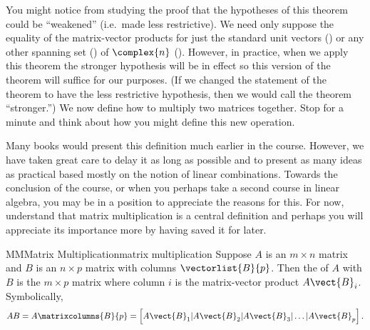 %
You might notice from studying the proof that the hypotheses of this theorem could be ``weakened'' (i.e.\  made less restrictive).   We need only suppose the equality of the matrix-vector products for just the standard unit vectors () or any other spanning set () of $\complex{n}$ ().  However, in practice, when we apply this theorem the stronger hypothesis will be in effect so this version of the theorem will suffice for our purposes.  (If we changed the statement of the theorem to have the less restrictive hypothesis, then we would call the theorem ``stronger.'')
%
%
We now define how to multiply two matrices together.  Stop for a minute and think about how you might define this new operation.\par
%
Many books would present this definition much earlier in the course.  However, we have taken great care to delay it as long as possible and to present as many ideas as practical based mostly on the notion of linear combinations.  Towards the conclusion of the course, or when you perhaps take a second course in linear algebra, you may be in a position to appreciate the reasons for this.  For now, understand that matrix multiplication is a central definition and perhaps you will appreciate its importance more by having saved it for later.
%
\begin{definition}{MM}{Matrix Multiplication}{matrix multiplication}
Suppose $A$ is an $m\times n$ matrix and $B$ is an $n\times p$ matrix with columns $\vectorlist{B}{p}$.  Then the  of $A$ with $B$ is the $m\times p$ matrix where column $i$ is the matrix-vector product $A\vect{B}_i$.  Symbolically,
%
\begin{equation*}
AB=A\matrixcolumns{B}{p}=\left[A\vect{B}_1|A\vect{B}_2|A\vect{B}_3|\ldots|A\vect{B}_p\right].
\end{equation*}
%
\end{definition}
%
